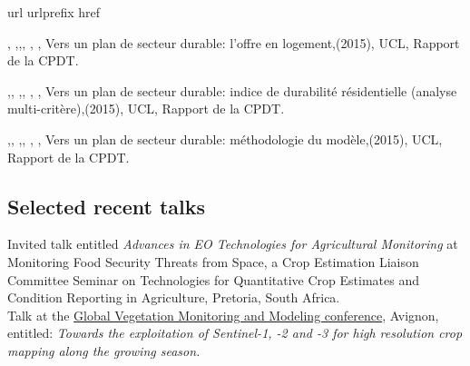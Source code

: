 \documentclass[11pt, a4paper]{article} %
\newcommand{\years}[1]{\marginnote{\footnotesize #1}} %
\begin{document}
\begingroup
\renewcommand{\section}[2]{}%
\begin{thebibliography}{10}
\expandafter\ifx\csname url\endcsname\relax
  \def\url#1{\texttt{#1}}\fi
\expandafter\ifx\csname urlprefix\endcsname\relax\def\urlprefix{URL }\fi
\expandafter\ifx\csname href\endcsname\relax
  \def\href#1#2{#2} \def\path#1{#1}\fi

, ,,, , ,
  \href{http://dial.uclouvain.be/pr/boreal/object/boreal:160879}{{Vers un plan de secteur durable: l'offre en logement}},(2015), UCL, Rapport de la CPDT. 
  
,, ,, , ,
  \href{http://dial.uclouvain.be/pr/boreal/object/boreal:160880}{{Vers un plan de secteur durable: indice de durabilit{\'e} r{\'e}sidentielle (analyse multi-crit{\`e}re)}},(2015), UCL, Rapport de la CPDT.

,, ,, , ,
  \href{http://dial.uclouvain.be/pr/boreal/object/boreal:158871}{{Vers un plan de secteur durable: m{\'e}thodologie du mod{\`e}le}},(2015), UCL, Rapport de la CPDT.


  
\end{thebibliography}
\endgroup


\subsection*{\hspace{-2.4cm}Selected recent talks}

\years{\raggedleft21/04/2016} Invited talk entitled \textit{Advances in EO Technologies for Agricultural Monitoring} at Monitoring Food Security Threats from Space, a Crop Estimation Liaison Committee Seminar on Technologies for Quantitative Crop Estimates and Condition Reporting in Agriculture, Pretoria, South Africa.\\

\years{\raggedleft05/02/2014} Talk at the \href{https://colloque6.inra.fr/gv2m/Oral-Sessions}{Global Vegetation Monitoring and Modeling conference}, Avignon, entitled: \textit{Towards the exploitation of Sentinel-1, -2 and -3 for high resolution crop mapping along the growing season.} \\
\end{document}
